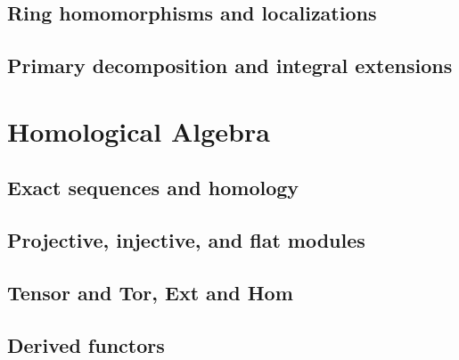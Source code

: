 \documentclass{article}
\begin{document}
\subsection{Ring homomorphisms and localizations}
\subsection{Primary decomposition and integral extensions}








\clearpage
\section{Homological Algebra}
\subsection{Exact sequences and homology}
\subsection{Projective, injective, and flat modules}
\subsection{Tensor and Tor, Ext and Hom}
\subsection{Derived functors}




\clearpage
\end{document}
